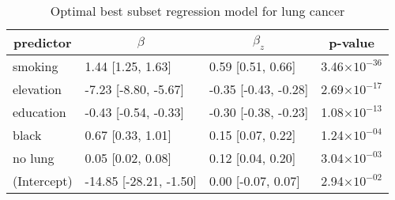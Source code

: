 \begin{table}[!tbp]
\caption{Optimal best subset regression model for lung cancer\label{SI_tab:lung}} 
\begin{center}
\begin{tabular}{llll}
\hline\hline
\multicolumn{1}{c}{predictor}&\multicolumn{1}{c}{$\beta$}&\multicolumn{1}{c}{$\beta_z$}&\multicolumn{1}{c}{p-value}\tabularnewline
\hline
smoking&1.44 [1.25, 1.63]&0.59 [0.51, 0.66]&3.46$\times10^{-36}$\tabularnewline
elevation&-7.23 [-8.80, -5.67]&-0.35 [-0.43, -0.28]&2.69$\times10^{-17}$\tabularnewline
education&-0.43 [-0.54, -0.33]&-0.30 [-0.38, -0.23]&1.08$\times10^{-13}$\tabularnewline
black&0.67 [0.33, 1.01]&0.15 [0.07, 0.22]&1.24$\times10^{-04}$\tabularnewline
no lung&0.05 [0.02, 0.08]&0.12 [0.04, 0.20]&3.04$\times10^{-03}$\tabularnewline
(Intercept)&-14.85 [-28.21, -1.50]&0.00 [-0.07, 0.07]&2.94$\times10^{-02}$\tabularnewline
\hline
\end{tabular}\end{center}

\end{table}
